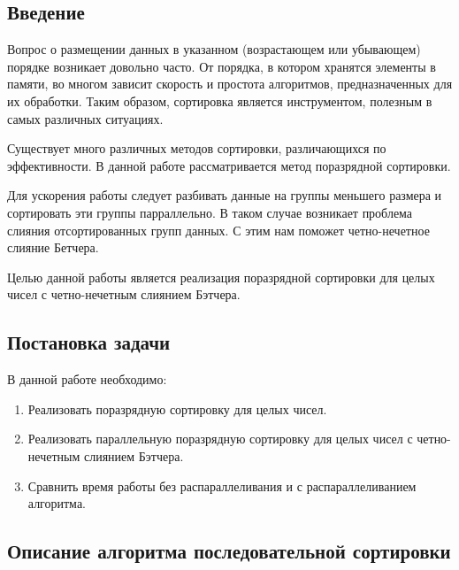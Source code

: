 \documentclass{report}
\begin{document}
\setcounter{page}{2}

\tableofcontents

\newpage
\begin{center}
\section*{Введение}
\end{center}

Вопрос о размещении данных в указанном (возрастающем или убывающем) порядке возникает довольно часто. От порядка, в котором хранятся элементы в памяти, во многом зависит скорость и простота алгоритмов, предназначенных для их обработки. Таким образом, сортировка является инструментом, полезным в самых различных ситуациях.
\par Существует много различных методов сортировки, различающихся по эффективности. В данной работе рассматривается метод поразрядной сортировки.
\par Для ускорения работы следует разбивать данные на группы меньшего размера и сортировать эти группы парраллельно. В таком случае возникает проблема слияния отсортированных групп данных. С этим нам поможет четно-нечетное слияние Бетчера.
\par Целью данной работы является реализация поразрядной сортировки для целых чисел с четно-нечетным слиянием Бэтчера. 

\newpage
\begin{center}
\section*{Постановка задачи}
\end{center}

В данной работе необходимо:
\begin{enumerate}
\item Реализовать поразрядную сортировку для целых чисел.
\item Реализовать параллельную поразрядную сортировку для целых чисел с четно-нечетным слиянием Бэтчера. 
\item Сравнить время работы без распараллеливания и с распараллеливанием алгоритма.
\end{enumerate}

\newpage
\begin{center}
\section*{Описание алгоритма последовательной сортировки}
\end{center}
\end{document}
